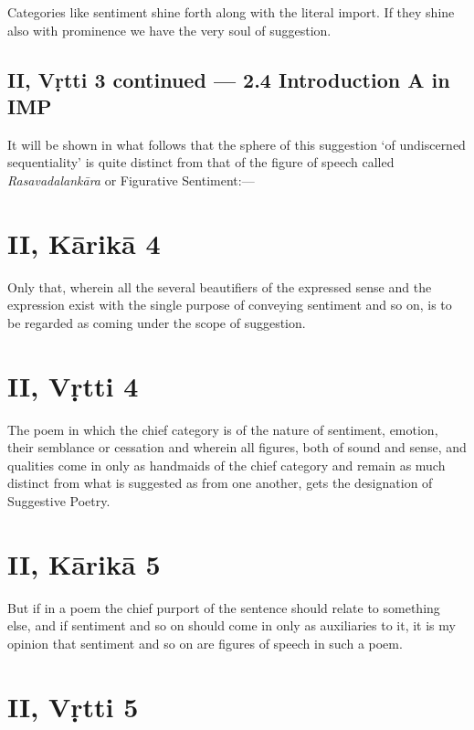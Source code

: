 \documentclass[12pt]{book}
\begin{document}
Categories like sentiment shine forth along with the literal
import. If they shine also with prominence we have the very
soul of suggestion.

\subsection{II, Vṛtti 3 continued --- 2.4 Introduction A in IMP}

It will be shown in what follows that the sphere of this
suggestion `of undiscerned sequentiality' is quite distinct from
that of the figure of speech called \textit{Rasavadalankāra} or Figurative
Sentiment:---



\section{II, Kārikā 4}

Only that, wherein all the several beautifiers of the expressed
sense and the expression exist with the single purpose of conveying sentiment and so on, is to be regarded as coming under
the scope of suggestion.


\section{II, Vṛtti 4}

The poem in which the chief category is of the nature of
sentiment, emotion, their semblance or cessation and wherein all
figures, both of sound and sense, and qualities come in only as
handmaids of the chief category and remain as much distinct
from what is suggested as from one another, gets the designation
of Suggestive Poetry.


\section{II, Kārikā 5}

But if in a poem the chief purport of the sentence should
relate to something else, and if sentiment and so on should
come in only as auxiliaries to it, it is my opinion that sentiment
and so on are figures of speech in such a poem.


\section{II, Vṛtti 5}
\end{document}
